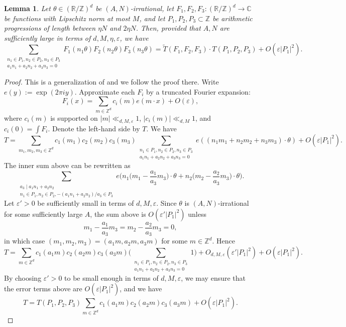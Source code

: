 \documentclass[12pt, notitlepage]{amsart}
\numberwithin{equation}{section}
\def\R{\mathbb R}
\def\Z{\mathbb Z}
\def\C{\mathbb C}
\def\wt{\widetilde}
\newcommand{\eps}{\varepsilon}
\newtheorem{lemma}[theorem]{Lemma}
\theoremstyle{remark}
\theoremstyle{definition}
\theoremstyle{remark}
\numberwithin{equation}{section}
\begin{document}
\begin{lemma}\label{lem:equi-dist}
Let $\theta \in (\R/\Z)^d$ be $(A,N)$-irrational, let $F_1,F_2,F_3: (\R/\Z)^d \rightarrow \C$ be functions with Lipschitz norm at most $M$, and let $P_1,P_2,P_3 \subset \Z$ be arithmetic progressions of length between $\eta N$ and $2\eta N$. Then, provided that $A,N$ are sufficiently large in terms of $d, M, \eta,\eps$, we have
$$
 \sum_{\substack{n_1 \in P_1,n_2\in P_2,n_3\in P_3 \\ a_1n_1+a_2n_2+a_3n_3=0}} F_1(n_1\theta) F_2(n_2\theta) F_3(n_3\theta)
 = \wt{T}(F_1, F_2, F_3)\cdot T(P_1,P_2,P_3) + O(\eps |P_1|^2).
 $$
\end{lemma}

\begin{proof}
This is a generalization of \cite[Lemma A.3]{EberhardGreenManners} and we follow the proof there. Write $e(y) := \exp(2\pi iy)$. Approximate each $F_i$ by a truncated Fourier expansion:
$$
F_i(x) = \sum_{m \in \Z^d} c_i(m)e(m\cdot x) + O(\eps),
$$
where $c_i(m)$ is supported on $|m| \ll_{d,M,\eps}1$, $|c_i(m)| \ll_{d,M}1$, and $c_i(0) = \int F_i$. Denote the left-hand side by $T$. We have
$$
T = \sum_{m_1,m_2,m_3 \in \Z^d}c_1(m_1)c_2(m_2)c_3(m_3) \sum_{\substack{n_1 \in P_1,n_2\in P_2,n_3\in P_3 \\ a_1n_1+a_2n_2+a_3n_3=0}} e((n_1m_1+n_2m_2+n_3m_3)\cdot \theta) + O(\eps |P_1|^2).
$$
The inner sum above can be rewritten as
$$
\sum_{\substack{a_3 \mid a_1n_1+a_2n_2 \\ n_1 \in P_1, n_2 \in P_2, -(a_1n_1+a_2n_2)/a_3 \in P_3}} e\Big(n_1\Big(m_1-\frac{a_1}{a_3}m_3\Big)\cdot\theta + n_2\Big(m_2-\frac{a_2}{a_3}m_3\Big)\cdot\theta\Big).
$$
Let $\eps' > 0$ be sufficiently small in terms of $d,M,\eps$. Since $\theta$ is $(A,N)$-irrational for some sufficiently large $A$, the sum above is $O(\eps' |P_1|^2)$ unless 
$$
m_1 - \frac{a_1}{a_3}m_3 = m_2 - \frac{a_2}{a_3}m_3 = 0,
$$
in which case $(m_1,m_2,m_3) = (a_1m, a_2m, a_3m)$ for some $m \in \Z^d$. Hence
$$
T = \sum_{m \in \Z^d} c_1(a_1m)c_2(a_2m)c_3(a_3m) \Big(\sum_{\substack{n_1 \in P_1,n_2\in P_2,n_3\in P_3 \\ a_1n_1+a_2n_2+a_3n_3=0}}1\Big) + O_{d,M,\eps}(\eps' |P_1|^2) + O(\eps |P_1|^2).
$$
By choosing $\eps' > 0$ to be small enough in terms of $d,M,\eps$, we may ensure that the error terms above are $O(\eps |P_1|^2)$, and we have
\begin{equation}\label{eq:equi-dist1}
T = T(P_1,P_2,P_3) \sum_{m \in \Z^d} c_1(a_1m)c_2(a_2m)c_3(a_3m) + O(\eps |P_1|^2).
\end{equation}

\end{proof}
\end{document}
